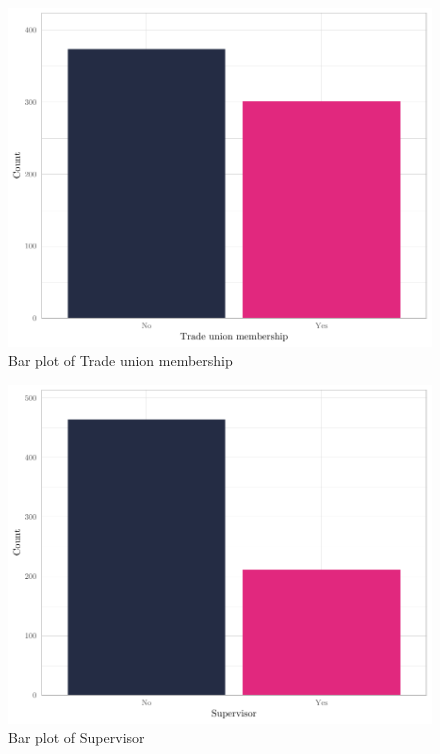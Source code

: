 \documentclass[
]{article}
\begin{document}
\begin{figure}[H]

{\centering \includegraphics[width=0.8\linewidth]{paper_files/figure-latex/unnamed-chunk-9-1} 

}

\caption{Bar plot of Trade union membership}\label{fig:unnamed-chunk-9}
\end{figure}

\begin{figure}[H]

{\centering \includegraphics[width=0.8\linewidth]{paper_files/figure-latex/unnamed-chunk-10-1} 

}

\caption{Bar plot of Supervisor}\label{fig:unnamed-chunk-10}
\end{figure}
\end{document}
